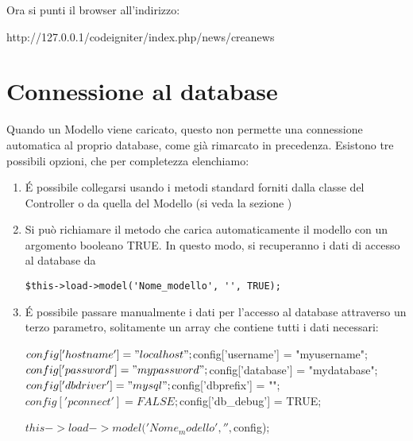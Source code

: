 
Ora si punti il browser all'indirizzo:

\begin{code}
http://127.0.0.1/codeigniter/index.php/news/creanews
\end{code}

\label{sec:accessodb}
\section*{Connessione al database}
Quando un Modello viene caricato, questo non permette una connessione automatica al proprio database, come già rimarcato in precedenza. Esistono tre possibili opzioni, che per completezza elenchiamo:

\begin{enumerate}
\item \'E possibile collegarsi usando i metodi standard forniti dalla classe del Controller o da quella del Modello (si veda la sezione )
\item Si può richiamare il metodo che carica automaticamente il modello con un argomento booleano TRUE. In questo modo, si recuperanno i dati di accesso al database da 

\verb|$this->load->model('Nome_modello', '', TRUE);|

\item \'E possibile passare manualmente i dati per l'accesso al database attraverso un terzo parametro, solitamente un array che contiene tutti i dati necessari:

\begin{code}
$config['hostname'] = "localhost";
$config['username'] = "myusername";
$config['password'] = "mypassword";
$config['database'] = "mydatabase";
$config['dbdriver'] = "mysql";
$config['dbprefix'] = "";
$config['pconnect'] = FALSE;
$config['db_debug'] = TRUE;

$this->load->model('Nome_modello', '', $config);
\end{code}
\end{enumerate}

